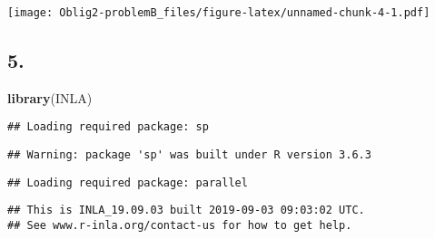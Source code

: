 \documentclass[
]{article}
\newenvironment{Shaded}{\begin{snugshade}}{\end{snugshade}}
\newcommand{\KeywordTok}[1]{\textcolor[rgb]{0.13,0.29,0.53}{\textbf{#1}}}
\newcommand{\NormalTok}[1]{#1}
\begin{document}
\texttt{[image: Oblig2-problemB\_files/figure-latex/unnamed-chunk-4-1.pdf]}

\hypertarget{section-4}{%
\subsection{5.}\label{section-4}}

\begin{Shaded}
\begin{Highlighting}[]
\KeywordTok{library}\NormalTok{(INLA)}
\end{Highlighting}
\end{Shaded}

\begin{verbatim}
## Loading required package: sp
\end{verbatim}

\begin{verbatim}
## Warning: package 'sp' was built under R version 3.6.3
\end{verbatim}

\begin{verbatim}
## Loading required package: parallel
\end{verbatim}

\begin{verbatim}
## This is INLA_19.09.03 built 2019-09-03 09:03:02 UTC.
## See www.r-inla.org/contact-us for how to get help.
\end{verbatim}
\end{document}
